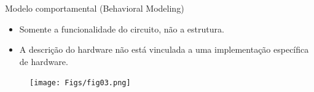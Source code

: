 \documentclass[aspectratio=169]{beamer}
\begin{document}
\begin{frame}{Modelo comportamental (Behavioral Modeling)}
	\justifying

	\begin{itemize}
	\justifying
	\item Somente a funcionalidade do circuito, não a estrutura.
	
	\item A descrição do hardware não está vinculada a uma implementação específica de hardware.

	
	
\end{itemize}

	
	\begin{figure}[h]
		\centering
		\texttt{[image: Figs/fig03.png]}
	\end{figure}
	
	
\end{frame}

\end{document}
